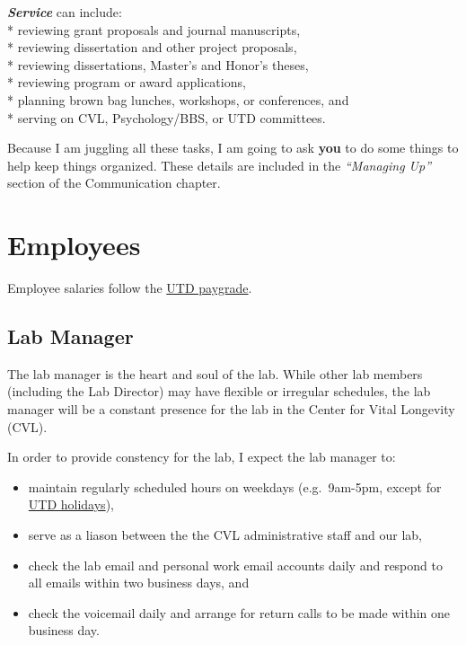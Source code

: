 \documentclass[
]{book}
\providecommand{\tightlist}{%
  \setlength{\itemsep}{0pt}\setlength{\parskip}{0pt}}
\begin{document}
\textbf{\emph{Service}} can include:\\
* reviewing grant proposals and journal manuscripts,\\
* reviewing dissertation and other project proposals,\\
* reviewing dissertations, Master's and Honor's theses,\\
* reviewing program or award applications,\\
* planning brown bag lunches, workshops, or conferences, and\\
* serving on CVL, Psychology/BBS, or UTD committees.

Because I am juggling all these tasks, I am going to ask \textbf{you} to do some things to help keep things organized. These details are included in the \emph{``Managing Up''} section of the Communication chapter.

\hypertarget{employees}{%
\section{Employees}\label{employees}}

Employee salaries follow the \href{https://www.utdallas.edu/hr/compensation/classified/}{UTD paygrade}.

\hypertarget{lab-manager}{%
\subsection{Lab Manager}\label{lab-manager}}

The lab manager is the heart and soul of the lab. While other lab members (including the Lab Director) may have flexible or irregular schedules, the lab manager will be a constant presence for the lab in the Center for Vital Longevity (CVL).

In order to provide constency for the lab, I expect the lab manager to:

\begin{itemize}
\tightlist
\item
  maintain regularly scheduled hours on weekdays (e.g.~9am-5pm, except for \href{https://www.utdallas.edu/hr/news/holidays/}{UTD holidays}),
\item
  serve as a liason between the the CVL administrative staff and our lab,\\
\item
  check the lab email and personal work email accounts daily and respond to all emails within two business days, and\\
\item
  check the voicemail daily and arrange for return calls to be made within one business day.
\end{itemize}
\end{document}
